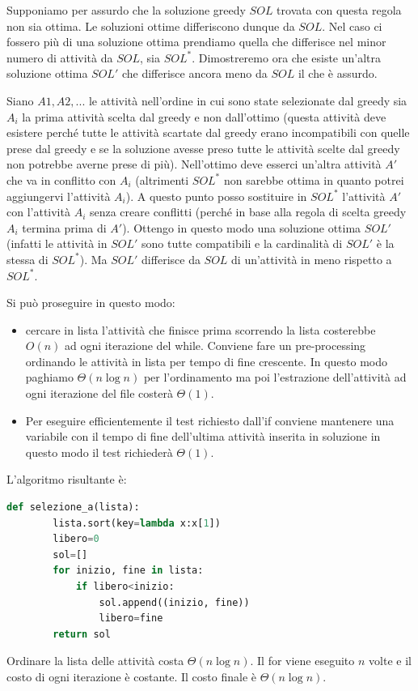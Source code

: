     \begin{demonstration}
        Supponiamo per assurdo che la soluzione greedy $SOL$ trovata con questa regola non sia ottima. Le soluzioni ottime differiscono dunque da $SOL$. Nel caso ci fossero più di una soluzione ottima prendiamo quella che differisce nel minor numero di attività da $SOL$, sia $SOL^*$. Dimostreremo ora che esiste un'altra soluzione ottima $SOL'$ che differisce ancora meno da $SOL$ il che è assurdo.

        Siano $A1, A2, ...$ le attività nell'ordine in cui sono state selezionate dal greedy sia $A_i$ la prima attività scelta dal greedy e non dall'ottimo (questa attività deve esistere perché tutte le attività scartate dal greedy erano incompatibili con quelle prese dal greedy e se la soluzione avesse preso tutte le attività scelte dal greedy non potrebbe averne prese di più). Nell'ottimo deve esserci un'altra attività $A'$ che va in conflitto con $A_i$ (altrimenti $SOL^*$ non sarebbe ottima in quanto potrei aggiungervi l'attività $A_i$). A questo punto posso sostituire in $SOL^*$ l'attività $A'$ con l'attività $A_i$ senza creare conflitti (perché in base alla regola di scelta greedy $A_i$ termina prima di $A'$). Ottengo in questo modo una soluzione ottima $SOL'$ (infatti le attività in $SOL'$ sono tutte compatibili e la cardinalità di $SOL'$ è la stessa di $SOL^*$). Ma $SOL'$ differisce da $SOL$ di un'attività in meno rispetto a $SOL^*$.
    \end{demonstration}

    Si può proseguire in questo modo:
    \begin{itemize}
        \item cercare in lista l'attività che finisce prima scorrendo la lista costerebbe $O(n)$ ad ogni iterazione del while. Conviene fare un pre-processing ordinando le attività in lista per tempo di fine crescente. In questo modo paghiamo $\Theta(n \log n)$ per l'ordinamento ma poi l'estrazione dell'attività ad ogni iterazione del file costerà $\Theta(1)$.
        \item Per eseguire efficientemente il test richiesto dall'if conviene mantenere una variabile con il tempo di fine dell'ultima attività inserita in soluzione in questo modo il test richiederà $\Theta(1)$.
    \end{itemize}

    L'algoritmo risultante è:
    \begin{lstlisting}[language=Python]
    def selezione_a(lista):
        lista.sort(key=lambda x:x[1])
        libero=0
        sol=[]
        for inizio, fine in lista:
            if libero<inizio:
                sol.append((inizio, fine))
                libero=fine
        return sol
    \end{lstlisting}
    Ordinare la lista delle attività costa $\Theta(n\log n)$. Il for viene eseguito $n$ volte e il costo di ogni iterazione è costante. Il costo finale è $\Theta(n\log n)$.

